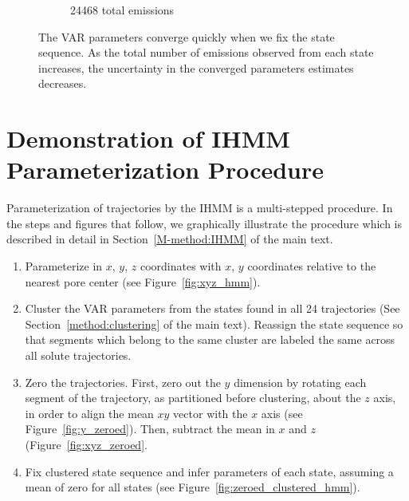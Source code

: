 \documentclass{article}
\begin{document}
\begin{figure}[h]
\begin{subfigure}{0.6\textwidth}
  \caption{24468 total emissions}\label{fig:convergence_MET_high}
  \end{subfigure}
  \caption{The VAR parameters converge quickly when we fix the state
  sequence. As the total number of emissions observed from each state
  increases, the uncertainty in the converged parameters estimates
  decreases.}\label{fig:fixed_state_convergence}
  \end{figure}
  
  \clearpage
  
  \section{Demonstration of IHMM Parameterization Procedure}\label{section:ihmm_procedure}
  
  Parameterization of trajectories by the IHMM is a multi-stepped procedure. In the steps and
  figures that follow, we graphically illustrate the procedure which is described in detail 
  in Section~\ref{M-method:IHMM} of the main text.
  
  \begin{enumerate}
  	\item Parameterize in $x$, $y$, $z$ coordinates with $x$, $y$ coordinates relative to the nearest
  	pore center (see Figure~\ref{fig:xyz_hmm}). 		
  	\item Cluster the VAR parameters from the states found in all 24 trajectories (See 
  	Section~\ref{method:clustering} of the main text). Reassign the state sequence so that segments
  	which belong to the same cluster are labeled the same across all solute trajectories.
  	\item Zero the trajectories. First, zero out the $y$ dimension by rotating each segment of 
  	the trajectory, as partitioned before clustering, about the $z$ axis, in order to align the 
  	mean $xy$ vector with the $x$ axis (see Figure~\ref{fig:y_zeroed}). Then, subtract the mean in
  	$x$ and $z$ (Figure~\ref{fig:xyz_zeroed}.
  	\item Fix clustered state sequence and infer parameters of each state, assuming a mean of zero
  	for all states (see Figure~\ref{fig:zeroed_clustered_hmm}). 
  \end{enumerate}
  
\end{document}
